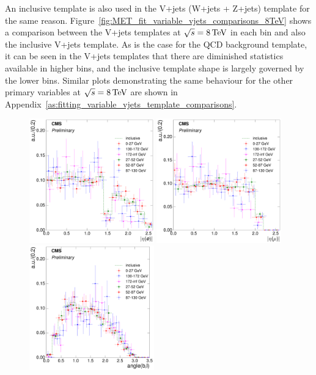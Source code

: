 An inclusive template is also used in the V+jets (W+jets + Z+jets) template for the same reason.
Figure~\ref{fig:MET_fit_variable_vjets_comparisons_8TeV} shows a comparison between the V+jets templates at
$\sqrt{s}=8\,\text{Te\hspace{-.08em}V}$ in each \met bin and also the inclusive \met V+jets template.
As is the case for the QCD background template, it can be seen in the V+jets templates that there are
diminished statistics available in higher bins, and the inclusive template shape is largely governed by the
lower bins. Similar plots demonstrating the same behaviour for the other primary variables at $\sqrt{s}=8\,\text{Te\hspace{-.08em}V}$
are shown in Appendix~\ref{as:fitting_variable_vjets_template_comparisons}.

\begin{figure}[hbtp]
    \centering
     \includegraphics[width=0.48\textwidth]{Chapters/04_Analysis/04b_XSections/images/8TeV/fit_variables/electron/MET/electron_absolute_eta/vjets/MET_electron_absolute_eta_2orMoreBtags_VJets_template_comparison.pdf}\hfill
     \includegraphics[width=0.48\textwidth]{Chapters/04_Analysis/04b_XSections/images/8TeV/fit_variables/muon/MET/muon_absolute_eta/vjets/MET_muon_absolute_eta_2orMoreBtags_VJets_template_comparison.pdf}\\
     \includegraphics[width=0.48\textwidth]{Chapters/04_Analysis/04b_XSections/images/8TeV/fit_variables/electron/MET/angle_bl/vjets/MET_angle_bl_2orMoreBtags_VJets_template_comparison.pdf}\hfill

\end{figure}
